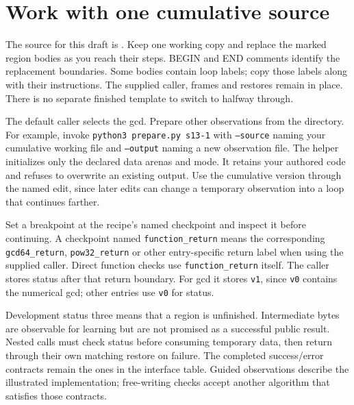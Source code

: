\section{Work with one cumulative source}
The source for this draft is . Keep one working
copy and replace the marked region bodies as you reach their steps. BEGIN and END
comments identify the replacement boundaries. Some bodies contain loop labels; copy
those labels along with their instructions. The supplied caller, frames and restores
remain in place. There is no separate finished template to switch to halfway through.

The default caller selects the gcd. Prepare other observations from the
 directory. For example, invoke \texttt{python3 prepare.py s13-1}
with \texttt{--source} naming your cumulative working file and \texttt{--output} naming
a new observation file. The helper initializes only the declared data arenas and mode.
It retains your authored code and refuses to overwrite an existing output. Use the
cumulative version through the named edit, since later edits can change a temporary
observation into a loop that continues farther.

Set a breakpoint at the recipe's named checkpoint and inspect it before continuing.
A checkpoint named \texttt{function\_return} means the corresponding
\texttt{gcd64\_return}, \texttt{pow32\_return} or other entry-specific return label when
using the supplied caller. Direct function checks use \texttt{function\_return} itself.
The caller stores status after that return boundary. For gcd it stores \texttt{v1},
since \texttt{v0} contains the numerical gcd; other entries use \texttt{v0} for status.

Development status three means that a region is unfinished. Intermediate bytes are
observable for learning but are not promised as a successful public result. Nested
calls must check status before consuming temporary data, then return through their own
matching restore on failure. The completed success/error contracts remain the ones in
the interface table. Guided observations describe the illustrated implementation;
free-writing checks accept another algorithm that satisfies those contracts.
